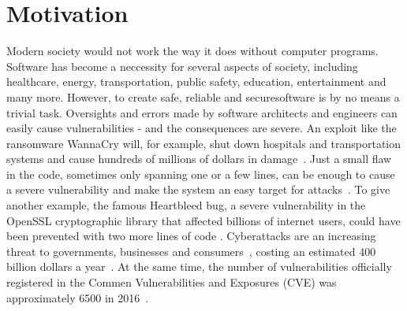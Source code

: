 \documentclass[
	a4paper,
	pagesize,
	pdftex,
	12pt,
	twoside, %
	BCOR=5mm, %
	ngerman,
	fleqn,
	final,
	]{scrartcl}
\begin{document}
\section{Motivation}\label{Motivation}
Modern society would not work the way it does without computer programs. Software has become a neccessity for several aspects of society, including healthcare, energy, transportation, public safety, education, entertainment and many more. However, to create safe, reliable and securesoftware is by no means a trivial task. Oversights and errors made by software architects and engineers can easily cause vulnerabilities - and the consequences are severe. An exploit like the ransomware WannaCry will, for example, shut down hospitals and transportation systems and cause hundreds of millions of dollars in damage~\cite{DanGoodin.2017}. Just a small flaw in the code, sometimes only spanning one or a few lines, can be enough to cause a severe vulnerability and make the system an easy target for attacks~\citep{Yamaguchi.2012}. To give another example, the famous Heartbleed bug, a severe vulnerability in the OpenSSL cryptographic library that affected billions of internet users, could have been prevented with two more lines of code \citep{Durumeric.2014}. Cyberattacks are an increasing threat to governments, businesses and consumers~\cite{Dam.2017}, costing an estimated 400 billion dollars a year~\cite{Losses.2014}. At the same time, the number of vulnerabilities officially registered in the Commen Vulnerabilities and Exposures (CVE) was approximately 6500 in 2016~\cite{CVE}. %
\newline
\end{document}
